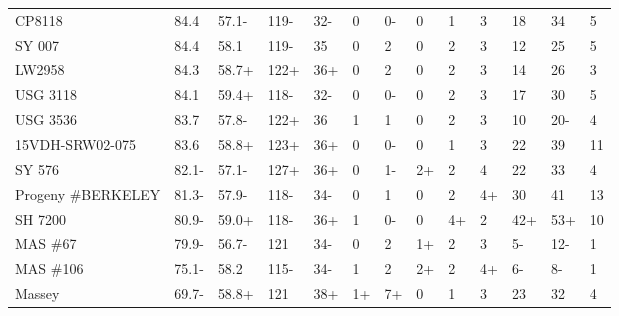 \documentclass[12pt, letterpaper]{article}
\begin{document}
\begin{landscape}
\begin{ThreePartTable}
\begin{longtable}{lllllllllllll}
  CP8118 & 84.4 & 57.1- & 119- & 32- & 0 & 0- & 0 & 1 & 3 & 18 & 34 & 5 \\ 
  SY 007 & 84.4 & 58.1 & 119- & 35 & 0 & 2 & 0 & 2 & 3 & 12 & 25 & 5 \\ 
  LW2958 & 84.3 & 58.7+ & 122+ & 36+ & 0 & 2 & 0 & 2 & 3 & 14 & 26 & 3 \\ 
  USG 3118 & 84.1 & 59.4+ & 118- & 32- & 0 & 0- & 0 & 2 & 3 & 17 & 30 & 5 \\ 
  USG 3536 & 83.7 & 57.8- & 122+ & 36 & 1 & 1 & 0 & 2 & 3 & 10 & 20- & 4 \\ 
  15VDH-SRW02-075 & 83.6 & 58.8+ & 123+ & 36+ & 0 & 0- & 0 & 1 & 3 & 22 & 39 & 11 \\ 
  SY 576 & 82.1- & 57.1- & 127+ & 36+ & 0 & 1- & 2+ & 2 & 4 & 22 & 33 & 4 \\ 
  Progeny \#BERKELEY & 81.3- & 57.9- & 118- & 34- & 0 & 1 & 0 & 2 & 4+ & 30 & 41 & 13 \\ 
  SH 7200 & 80.9- & 59.0+ & 118- & 36+ & 1 & 0- & 0 & 4+ & 2 & 42+ & 53+ & 10 \\ 
  MAS \#67 & 79.9- & 56.7- & 121 & 34- & 0 & 2 & 1+ & 2 & 3 & 5- & 12- & 1 \\ 
  MAS \#106 & 75.1- & 58.2 & 115- & 34- & 1 & 2 & 2+ & 2 & 4+ & 6- & 8- & 1 \\ 
  Massey & 69.7- & 58.8+ & 121 & 38+ & 1+ & 7+ & 0 & 1 & 3 & 23 & 32 & 4 \\ 
\end{longtable}

\end{ThreePartTable}


\newpage


\end{landscape}
\end{document}
